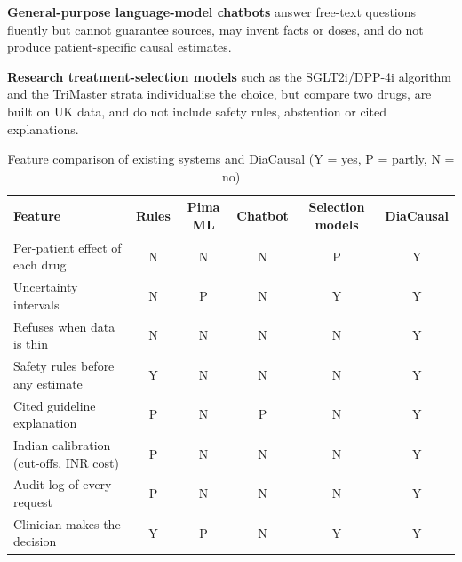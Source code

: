\textbf{General-purpose language-model chatbots} answer free-text questions fluently but cannot guarantee sources, may invent facts or doses, and do not produce patient-specific causal estimates.

\textbf{Research treatment-selection models} such as the SGLT2i/DPP-4i algorithm \cite{dennis2022} and the TriMaster strata \cite{shields2023} individualise the choice, but compare two drugs, are built on UK data, and do not include safety rules, abstention or cited explanations.

\begin{table}[H]\centering\small
\caption{Feature comparison of existing systems and DiaCausal (Y = yes, P = partly, N = no)}\label{tab:feat}
\begin{tabularx}{\textwidth}{Yccccc}
\toprule
Feature & Rules & Pima ML & Chatbot & Selection models & DiaCausal\\\midrule
Per-patient effect of each drug & N & N & N & P & Y\\
Uncertainty intervals & N & P & N & Y & Y\\
Refuses when data is thin & N & N & N & N & Y\\
Safety rules before any estimate & Y & N & N & N & Y\\
Cited guideline explanation & P & N & P & N & Y\\
Indian calibration (cut-offs, INR cost) & P & N & N & N & Y\\
Audit log of every request & P & N & N & N & Y\\
Clinician makes the decision & Y & P & N & Y & Y\\
\bottomrule\end{tabularx}\end{table}
